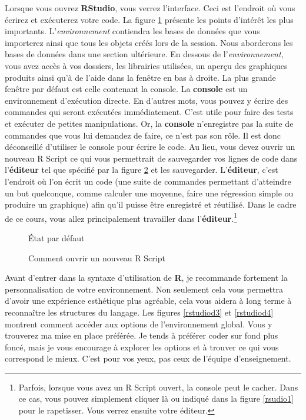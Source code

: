 \documentclass[10.5pt,a4paper]{article}
\begin{document}
Lorsque vous ouvrez \textbf{RStudio}, vous verrez l'interface. Ceci est l'endroit où vous écrirez et exécuterez votre code. La figure \ref{rstudio1} présente les points d'intérêt les plus importants. L'\emph{environnement} contiendra les bases de données que vous importerez ainsi que tous les objets créés lors de la session. Nous aborderons les bases de données dans une section ultérieure. En dessous de l'\emph{environnement}, vous avez accès à vos dossiers, les librairies utilisées, un aperçu des graphiques produits ainsi qu'à de l'aide dans la fenêtre en bas à droite. La plus grande fenêtre par défaut est celle contenant la console. La \textbf{console} est un environnement d'exécution directe. En d'autres mots, vous pouvez y écrire des commandes qui seront exécutées immédiatement. C'est utile pour faire des tests et exécuter de petites manipulations. Or, la \textbf{console} n'enregistre pas la suite de commandes que vous lui demandez de faire, ce n'est pas son rôle. Il est donc déconseillé d'utiliser le console pour écrire le code. Au lieu, vous devez ouvrir un nouveau R Script ce qui vous permettrait de sauvegarder vos lignes de code dans l'\textbf{éditeur} tel que spécifié par la figure \ref{rstudio2} et les sauvegarder. L'\textbf{éditeur}, c'est l'endroit où l'on écrit un code (une suite de commandes permettant d'atteindre un but quelconque, comme calculer une moyenne, faire une régression simple ou produire un graphique) afin qu'il puisse être enregistré et réutilisé. Dans le cadre de ce cours, vous allez principalement travailler dans l'\textbf{éditeur}.\footnote{Parfois, lorsque vous avez un R Script ouvert, la console peut le cacher. Dans ce cas, vous pouvez simplement cliquer là ou indiqué dans la figure \ref{rsudio1} pour le rapetisser. Vous verrez ensuite votre éditeur.} 

\begin{figure}[H]
  \centering
  \caption{État par défaut}
  \label{rstudio1}
\end{figure}

\begin{figure}[H]
  \centering
  \caption{Comment ouvrir un nouveau R Script}
  \label{rstudio2}
\end{figure}

Avant d'entrer dans la syntaxe d'utilisation de \textbf{R}, je recommande fortement la personnalisation de votre environnement. Non seulement cela vous permettra d'avoir une expérience esthétique plus agréable, cela vous aidera à long terme à reconnaître les structures du langage. Les figures \ref{rstudiod3} et \ref{rstudiod4} montrent comment accéder aux options de l'environnement global. Vous y trouverez ma mise en place préférée. Je tends à préférer coder sur fond plus foncé, mais je vous encourage à explorer les options et à trouver ce qui vous correspond le mieux. C'est pour vos yeux, pas ceux de l'équipe d'enseignement. 
\end{document}
